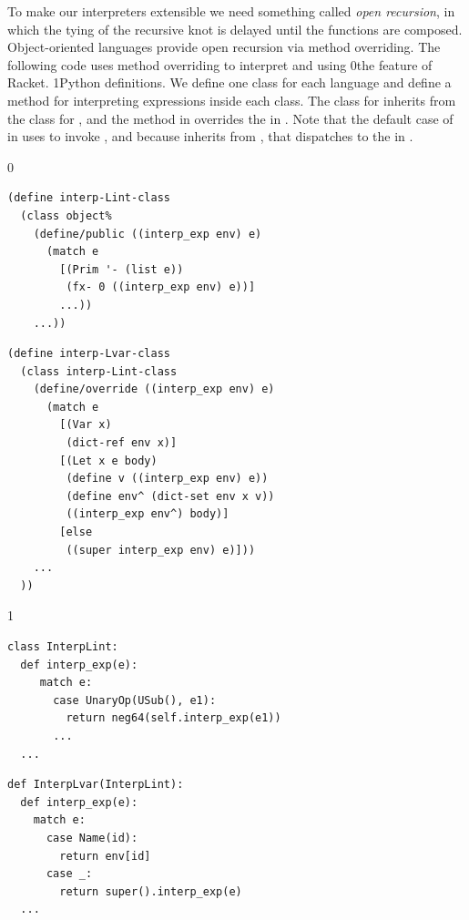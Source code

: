 \documentclass[7x10]{TimesAPriori_MIT}%
\def\racketEd{0}
\def\pythonEd{1}
\def\edition{1}
\newcommand{\racket}[1]{{\if\edition\racketEd{#1}\fi}}
\newcommand{\pythonColor}[0]{}
\newcommand{\python}[1]{{\if\edition\pythonEd\pythonColor #1\fi}}
\numberwithin{theorem}{chapter}
\numberwithin{definition}{chapter}
\numberwithin{equation}{chapter}
\begin{document}
To make our interpreters extensible we need something called
\emph{open recursion}, in which the
tying of the recursive knot is delayed until the functions are
composed. Object-oriented languages provide open recursion via method
overriding. The following code uses
method overriding to interpret \LangInt{} and \LangVar{} using
%
\racket{the
  \href{https://docs.racket-lang.org/guide/classes.html}{\code{class}}
  \index{subject}{class} feature of Racket.}%
%
\python{Python  definitions.}
%
We define one class for each language and define a method for
interpreting expressions inside each class. The class for \LangVar{}
inherits from the class for \LangInt{}, and the method
 in \LangVar{} overrides the  in
\LangInt{}. Note that the default case of  in
\LangVar{} uses  to invoke , and because
\LangVar{} inherits from \LangInt{}, that dispatches to the
 in \LangInt{}.
\begin{center}
  \hspace{-20pt}
{\if\edition\racketEd  
\begin{minipage}{0.45\textwidth}
\begin{lstlisting}
(define interp-Lint-class
  (class object%
    (define/public ((interp_exp env) e)
      (match e
        [(Prim '- (list e))
         (fx- 0 ((interp_exp env) e))]
        ...))
    ...))
\end{lstlisting}
\end{minipage}
\begin{minipage}{0.45\textwidth}
  \begin{lstlisting}
(define interp-Lvar-class
  (class interp-Lint-class
    (define/override ((interp_exp env) e)
      (match e
        [(Var x)
         (dict-ref env x)]
        [(Let x e body)
         (define v ((interp_exp env) e))
         (define env^ (dict-set env x v))
         ((interp_exp env^) body)]
        [else
         ((super interp_exp env) e)]))
    ...
  ))
\end{lstlisting}
\end{minipage}
\fi}
{\if\edition\pythonEd\pythonColor
\begin{minipage}{0.45\textwidth}
\begin{lstlisting}
class InterpLint:
  def interp_exp(e):
     match e:
       case UnaryOp(USub(), e1):
         return neg64(self.interp_exp(e1))
       ...
  ...
\end{lstlisting}
\end{minipage}
\begin{minipage}{0.45\textwidth}
  \begin{lstlisting}
def InterpLvar(InterpLint):
  def interp_exp(e):
    match e:
      case Name(id):
        return env[id]
      case _:
        return super().interp_exp(e)
  ...
\end{lstlisting}
\end{minipage}
\fi}
\end{center}
\end{document}
